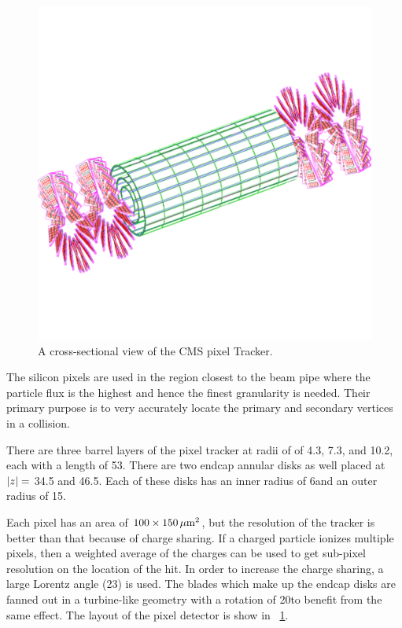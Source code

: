 \begin{figure}[tb]
    \centering
    \includegraphics[width=\textwidth]{figures/pixel_layout.pdf}
    \caption{A cross-sectional view of the CMS pixel Tracker.}
    \label{fig:pixel_layout}
\end{figure}

The silicon pixels are used in the region closest to the beam pipe where the
particle flux is the highest and hence the finest granularity is needed. Their
primary purpose is to very accurately locate the primary and secondary vertices
in a collision.

There are three barrel layers of the pixel tracker at radii of of 4.3, 7.3, and
10.2\centimeters, each with a length of 53\centimeters. There are two endcap
annular disks as well placed at $|z|=$ 34.5 and 46.5\centimeters. Each of
these disks has an inner radius of 6\centimeters and an outer radius of
15\centimeters.

Each pixel has an area of $100 \times 150 \text{\,$\mu$m}^{2}$, but the resolution
of the tracker is better than that because of charge sharing. If a charged
particle ionizes multiple pixels, then a weighted average of the charges can be
used to get sub-pixel resolution on the location of the hit. In order to
increase the charge sharing, a large Lorentz angle (23\degrees) is used. The
blades which make up the endcap disks are fanned out in a turbine-like geometry
with a rotation of 20\degrees to benefit from the same effect. The layout of
the pixel detector is show in \FIG~\ref{fig:pixel_layout}.

